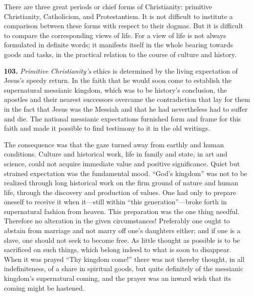 \documentclass[12pt,a4paper]{book}
\newcommand{\opage}[1]{\marginnote{\footnotesize\textit{[#1]}}}
\begin{document}
There are three great periods or chief forms of Christianity: primitive Christianity, Catholicism, and
Protestantism. It is not difficult to institute a comparison between these forms with respect to their
dogmas. But it is difficult to compare the corresponding views of life. For a view of life is not always
formulated in definite words; it manifests itself in the whole bearing towards goods and tasks, in the
practical relation to the course of culture and history.

\medskip

\noindent\textbf{103.} \emph{Primitive Christianity's} ethics is determined by the living expectation of
Jesus's speedy return. In the faith that he would soon come to establish the supernatural messianic
kingdom, which was to be history's conclusion, the apostles and their nearest successors overcame the
contradiction that lay for them in the fact that Jesus 
\opage{230}was the Messiah and that he had nevertheless had to
suffer and die. The national messianic expectations furnished form and frame for this faith and made it
possible to find testimony to it in the old writings.

The consequence was that the gaze turned away from earthly and human conditions. Culture and historical
work, life in family and state, in art and science, could not acquire immediate value and positive
significance. Quiet but strained expectation was the fundamental mood. ``God's kingdom'' was not to be
realized through long historical work on the firm ground of nature and human life, through the discovery
and production of values. One had only to prepare oneself to receive it when it---still within ``this
generation''---broke forth in supernatural fashion from heaven. This preparation was the one thing needful.
Therefore no alteration in the given circumstances! Preferably one ought to abstain from marriage and not
marry off one's daughters either; and if one is a slave, one should not seek to become free. As little
thought as possible is to be sacrificed on such things, which belong indeed to what is soon to disappear.
When it was prayed ``Thy kingdom come!'' there was not thereby thought, in all indefiniteness, of a share
in spiritual goods, but quite definitely of the messianic kingdom's supernatural coming, and the prayer was
an inward wish that its coming might be hastened.
\end{document}
